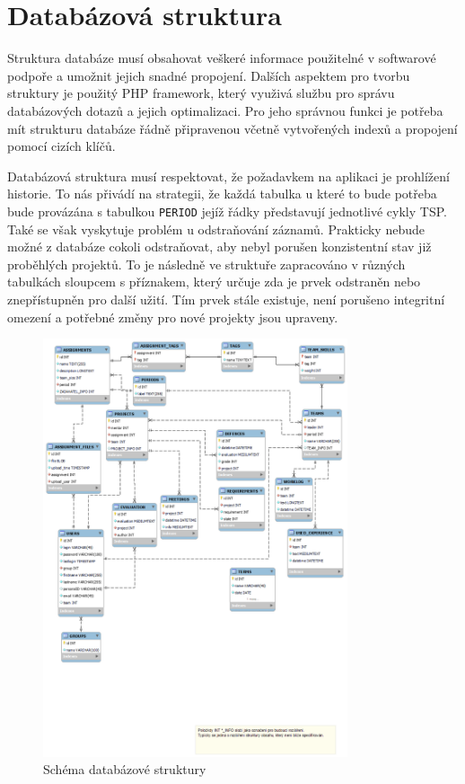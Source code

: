 \documentclass[czech,BP]{thesiskiv}
\begin{document}
	\section{Databázová struktura}
		\par Struktura databáze musí obsahovat veškeré informace použitelné v softwarové podpoře a umožnit jejich snadné propojení. Dalších aspektem pro tvorbu struktury je použitý PHP framework, který využivá službu pro správu databázových dotazů a jejich optimalizaci. Pro jeho správnou funkci je potřeba mít strukturu databáze řádně připravenou včetně vytvořených indexů a propojení pomocí cizích klíčů.
		\par Databázová struktura musí respektovat, že požadavkem na aplikaci je prohlížení historie. To nás přivádí na strategii, že každá tabulka u které to bude potřeba bude provázána s tabulkou \texttt{PERIOD} jejíž řádky představují jednotlivé cykly TSP. Také se však vyskytuje problém u odstraňování záznamů. Prakticky nebude možné z databáze cokoli odstraňovat, aby nebyl porušen konzistentní stav již proběhlých projektů. To je následně ve struktuře zapracováno v různých tabulkách sloupcem s příznakem, který určuje zda je prvek odstraněn nebo znepřístupněn pro další užití. Tím prvek stále existuje, není porušeno integritní omezení a potřebné změny pro nové projekty jsou upraveny.
		
		\begin{figure}[H]
			\centering
			\includegraphics[width=0.8\textwidth]{img/database/database_model}
			\caption{Schéma databázové struktury}
		\end{figure}
\end{document}
